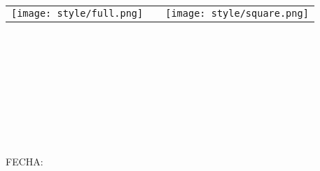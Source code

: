 \begin{titlepage}
    \centering
    \bfseries {
        \null{}
        \vspace{0cm}
        \begin{table}[h]
            \centering
            \begin{tabular}{m{10cm} m{1cm} m{3cm}}
                \vspace{0.2cm}
                \texttt{[image: style/full.png]} &  & \vspace{1.52mm} \texttt{[image: style/square.png]} \\
            \end{tabular}
        \end{table}

        \vspace{3\baselineskip}

        \Large{\ORG{} \\ \vspace{3\baselineskip}}
        \large {
            \AREA{} \\ \vspace{3\baselineskip}
            \subject{} \\ \vspace{2\baselineskip}

            \title{} \\ \vspace{3\baselineskip}

            \author{} \\
            \authorid{} \\

            \vspace{2\baselineskip}
            FECHA:\@ \date{}
        }
    }
\end{titlepage}
